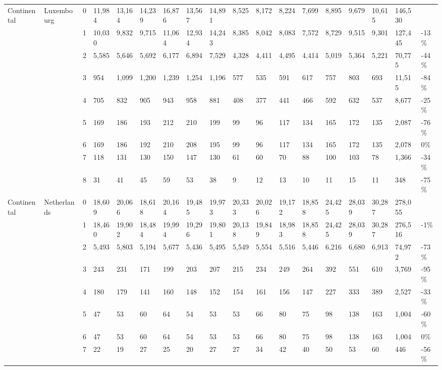 \begin{longtable}{llllllllllllllllll}
  Continental & Luxembourg & 0 & 11,984 & 13,164 & 14,239 & 16,876 & 13,567 & 14,891 & 8,525 & 8,172 & 8,224 & 7,699 & 8,895 & 9,679 & 10,615 & 146,530 &  \\ 
   &  & 1 & 10,030 & 9,832 & 9,715 & 11,064 & 12,934 & 14,243 & 8,385 & 8,042 & 8,083 & 7,572 & 8,729 & 9,515 & 9,301 & 127,445 & -13\% \\ 
   &  & 2 & 5,585 & 5,646 & 5,692 & 6,177 & 6,894 & 7,529 & 4,328 & 4,411 & 4,495 & 4,414 & 5,019 & 5,364 & 5,221 & 70,775 & -44\% \\ 
   &  & 3 & 954 & 1,099 & 1,200 & 1,239 & 1,254 & 1,196 & 577 & 535 & 591 & 617 & 757 & 803 & 693 & 11,515 & -84\% \\ 
   &  & 4 & 705 & 832 & 905 & 943 & 958 & 881 & 408 & 377 & 441 & 466 & 592 & 632 & 537 & 8,677 & -25\% \\ 
   &  & 5 & 169 & 186 & 193 & 212 & 210 & 199 & 99 & 96 & 117 & 134 & 165 & 172 & 135 & 2,087 & -76\% \\ 
   &  & 6 & 169 & 186 & 192 & 210 & 208 & 195 & 99 & 96 & 117 & 134 & 165 & 172 & 135 & 2,078 & 0\% \\ 
   &  & 7 & 118 & 131 & 130 & 150 & 147 & 130 & 61 & 60 & 70 & 88 & 100 & 103 & 78 & 1,366 & -34\% \\ 
   &  & 8 & 31 & 41 & 45 & 59 & 53 & 38 & 9 & 12 & 13 & 10 & 11 & 15 & 11 & 348 & -75\% \\ 
  Continental & Netherlands & 0 & 18,609 & 20,066 & 18,618 & 20,164 & 19,485 & 19,973 & 20,333 & 20,026 & 19,172 & 18,858 & 24,425 & 28,039 & 30,287 & 278,055 &  \\ 
   &  & 1 & 18,460 & 19,902 & 18,484 & 19,994 & 19,296 & 19,801 & 20,138 & 19,849 & 18,983 & 18,858 & 24,425 & 28,039 & 30,287 & 276,516 & -1\% \\ 
   &  & 2 & 5,493 & 5,803 & 5,194 & 5,677 & 5,436 & 5,495 & 5,549 & 5,554 & 5,516 & 5,446 & 6,216 & 6,680 & 6,913 & 74,972 & -73\% \\ 
   &  & 3 & 243 & 231 & 171 & 199 & 203 & 207 & 215 & 234 & 249 & 264 & 392 & 551 & 610 & 3,769 & -95\% \\ 
   &  & 4 & 180 & 179 & 141 & 160 & 148 & 152 & 154 & 161 & 156 & 147 & 227 & 333 & 389 & 2,527 & -33\% \\ 
   &  & 5 & 47 & 53 & 60 & 64 & 54 & 53 & 53 & 66 & 80 & 75 & 98 & 138 & 163 & 1,004 & -60\% \\ 
   &  & 6 & 47 & 53 & 60 & 64 & 54 & 53 & 53 & 66 & 80 & 75 & 98 & 138 & 163 & 1,004 & 0\% \\ 
   &  & 7 & 22 & 19 & 27 & 25 & 20 & 27 & 27 & 34 & 42 & 40 & 50 & 53 & 60 & 446 & -56\% \\ 

\end{longtable}
